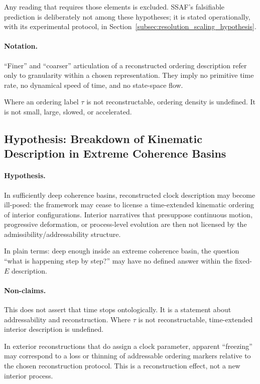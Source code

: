 \documentclass[aps,prx,onecolumn,11pt]{revtex4-2}
\theoremstyle{plain}
\theoremstyle{definition}
\theoremstyle{remark}
\begin{document}
Any reading that requires those elements is excluded. SSAF's
falsifiable prediction is deliberately not among these hypotheses; it
is stated operationally, with its experimental protocol, in
Section~\ref{subsec:resolution_scaling_hypothesis}.

\paragraph{Notation.}

``Finer'' and ``coarser'' articulation of a reconstructed ordering
description refer only to granularity within a chosen representation.
They imply no primitive time rate, no dynamical speed of time, and no
state-space flow.

Where an ordering label \(\tau\) is not reconstructable, ordering
density is undefined. It is not small, large, slowed, or accelerated.

\subsection{Hypothesis: Breakdown of Kinematic Description in Extreme Coherence Basins}
\label{subsec:boundary_spaghettification}

\paragraph{Hypothesis.}

In sufficiently deep coherence basins, reconstructed clock description
may become ill-posed: the framework may cease to license a
time-extended kinematic ordering of interior configurations. Interior
narratives that presuppose continuous motion, progressive deformation,
or process-level evolution are then not licensed by the
admissibility/addressability structure.

In plain terms: deep enough inside an extreme coherence basin, the
question ``what is happening step by step?'' may have no defined answer
within the fixed-\(E\) description.

\paragraph{Non-claims.}

This does not assert that time stops ontologically. It is a statement
about addressability and reconstruction. Where \(\tau\) is not
reconstructable, time-extended interior description is undefined.

In exterior reconstructions that do assign a clock parameter, apparent
``freezing'' may correspond to a loss or thinning of addressable
ordering markers relative to the chosen reconstruction protocol. This
is a reconstruction effect, not a new interior process.
\end{document}
